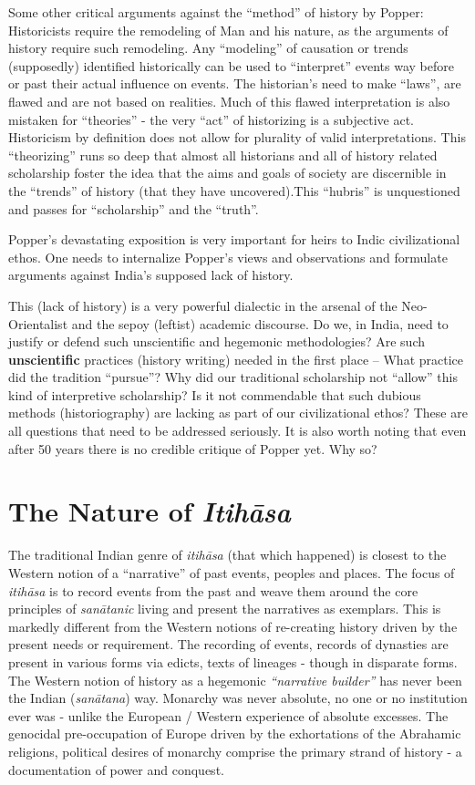 Some other critical arguments against the “method” of history by Popper: Historicists require the remodeling of Man and his nature, as the arguments of history require such remodeling. Any “modeling” of causation or trends (supposedly) identified historically can be used to “interpret” events way before or past their actual influence on events. The historian’s need to make “laws”, are flawed and are not based on realities. Much of this flawed interpretation is also mistaken for “theories” - the very “act” of historizing is a subjective act. Historicism by definition does not allow for plurality of valid interpretations. This “theorizing” runs so deep that almost all historians and all of history related scholarship foster the idea that the aims and goals of society are discernible in the “trends” of history (that they have uncovered).This “hubris” is unquestioned and passes for “scholarship” and the “truth”.

Popper’s devastating exposition is very important for heirs to Indic civilizational ethos. One needs to internalize Popper’s views and observations and formulate arguments against India’s supposed lack of history. 

This (lack of history) is a very powerful dialectic in the arsenal of the Neo-Orientalist and the sepoy (leftist) academic discourse. Do we, in India, need to justify or defend such unscientific and hegemonic methodologies? Are such \textbf{unscientific} practices (history writing) needed in the first place – What practice did the tradition “pursue”? Why did our traditional scholarship not “allow” this kind of interpretive scholarship? Is it not commendable that such dubious methods (historiography) are lacking as part of our civilizational ethos? These are all questions that need to be addressed seriously. It is also worth noting that even after 50 years there is no credible critique of Popper yet. Why so?


\section*{The Nature of \textit{Itihāsa}}

The traditional Indian genre of \textit{itihāsa} (that which happened) is closest to the Western notion of a “narrative” of past events, peoples and places. The focus of \textit{itihāsa} is to record events from the past and weave them around the core principles of \textit{sanātanic} living and present the narratives as exemplars. This is markedly different from the Western notions of re-creating history driven by the present needs or requirement. The recording of events, records of dynasties are present in various forms via edicts, texts of lineages - though in disparate forms. The Western notion of history as a hegemonic \textit{“narrative builder”} has never been the Indian (\textit{sanātana}) way. Monarchy was never absolute, no one or no institution ever was - unlike the European / Western experience of absolute excesses. The genocidal pre-occupation of Europe driven by the exhortations of the Abrahamic religions, political desires of monarchy comprise the primary strand of history - a documentation of power and conquest.


